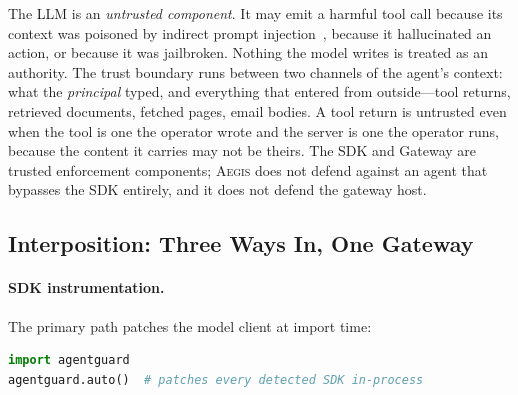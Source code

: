 \documentclass[sigconf,nonacm]{acmart}
\newcommand{\system}{\textsc{Aegis}\xspace}
\begin{document}
The LLM is an \emph{untrusted component}. It may emit a harmful tool
call because its context was poisoned by indirect prompt
injection~\cite{greshake2023not}, because it hallucinated an action, or
because it was jailbroken. Nothing the model writes is treated as an
authority. The trust boundary runs between two channels of the agent's
context: what the \emph{principal} typed, and everything that entered
from outside---tool returns, retrieved documents, fetched pages, email
bodies. A tool return is untrusted even when the tool is one the
operator wrote and the server is one the operator runs, because the
content it carries may not be theirs. The SDK and Gateway are trusted
enforcement components; \system does not defend against an agent that
bypasses the SDK entirely, and it does not defend the gateway host.

\subsection{Interposition: Three Ways In, One Gateway}
\label{sec:sdk}

\paragraph{SDK instrumentation.}
The primary path patches the model client at import time:

\begin{lstlisting}[language=Python, basicstyle=\scriptsize\ttfamily]
import agentguard
agentguard.auto()  # patches every detected SDK in-process
\end{lstlisting}
\end{document}
